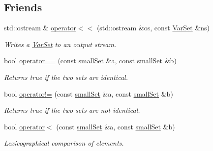 \subsection*{Friends}
\begin{CompactItemize}
\item 
\hypertarget{classdai_1_1VarSet_60119e272c8abb87508fb8dd5fad06d6}{
std::ostream \& \hyperlink{classdai_1_1VarSet_60119e272c8abb87508fb8dd5fad06d6}{operator$<$$<$} (std::ostream \&os, const \hyperlink{classdai_1_1VarSet}{VarSet} \&ns)}
\label{classdai_1_1VarSet_60119e272c8abb87508fb8dd5fad06d6}

\begin{CompactList}\small\item\em Writes a \hyperlink{classdai_1_1VarSet}{VarSet} to an output stream. \item\end{CompactList}\item 
\hypertarget{classdai_1_1smallSet_60606e0d17f55f318f329d556f0c9f80}{
bool \hyperlink{classdai_1_1smallSet_60606e0d17f55f318f329d556f0c9f80}{operator==} (const \hyperlink{classdai_1_1smallSet}{smallSet} \&a, const \hyperlink{classdai_1_1smallSet}{smallSet} \&b)}
\label{classdai_1_1smallSet_60606e0d17f55f318f329d556f0c9f80}

\begin{CompactList}\small\item\em Returns true if the two sets are identical. \item\end{CompactList}\item 
\hypertarget{classdai_1_1smallSet_49e074002843253d59bbe70241e79d84}{
bool \hyperlink{classdai_1_1smallSet_49e074002843253d59bbe70241e79d84}{operator!=} (const \hyperlink{classdai_1_1smallSet}{smallSet} \&a, const \hyperlink{classdai_1_1smallSet}{smallSet} \&b)}
\label{classdai_1_1smallSet_49e074002843253d59bbe70241e79d84}

\begin{CompactList}\small\item\em Returns true if the two sets are not identical. \item\end{CompactList}\item 
\hypertarget{classdai_1_1smallSet_44abfb513a428e283045812964dc64e5}{
bool \hyperlink{classdai_1_1smallSet_44abfb513a428e283045812964dc64e5}{operator$<$} (const \hyperlink{classdai_1_1smallSet}{smallSet} \&a, const \hyperlink{classdai_1_1smallSet}{smallSet} \&b)}
\label{classdai_1_1smallSet_44abfb513a428e283045812964dc64e5}

\begin{CompactList}\small\item\em Lexicographical comparison of elements. \item\end{CompactList}\end{CompactItemize}



